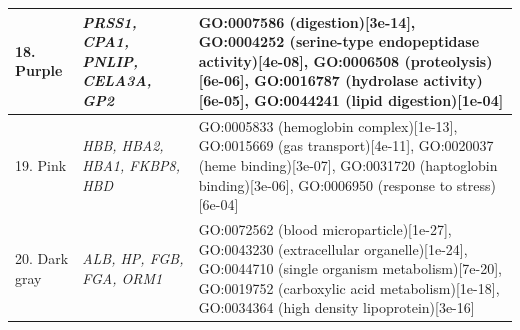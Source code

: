 \documentclass[10pt,letterpaper]{article}
\begin{document}
\begin{table}[!hp]
\begin{adjustwidth}{-2in}{0in}
\begin{tabular}{|p{1.0in}|p{1.5in}|p{4.5in}|}
18. Purple & \textit{PRSS1, CPA1, PNLIP, CELA3A, GP2} & GO:0007586 (digestion)[3e-14], GO:0004252 (serine-type endopeptidase activity)[4e-08], GO:0006508 (proteolysis)[6e-06], GO:0016787 (hydrolase activity)[6e-05], GO:0044241 (lipid digestion)[1e-04]\\ \hline
19. Pink & \textit{HBB, HBA2, HBA1, FKBP8, HBD} & GO:0005833 (hemoglobin complex)[1e-13], GO:0015669 (gas transport)[4e-11], GO:0020037 (heme binding)[3e-07], GO:0031720 (haptoglobin binding)[3e-06], GO:0006950 (response to stress)[6e-04] \\ \hline
20. Dark gray  & \textit{ALB, HP, FGB, FGA, ORM1} & GO:0072562 (blood microparticle)[1e-27], GO:0043230 (extracellular organelle)[1e-24],  GO:0044710 (single organism metabolism)[7e-20], GO:0019752 (carboxylic acid metabolism)[1e-18], GO:0034364 (high density lipoprotein)[3e-16] \\ \hline
\end{tabular} \label{tab1}
\end{adjustwidth}
\end{table}
\end{document}
